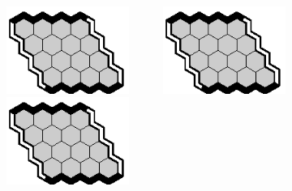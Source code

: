 \documentclass[12pt]{article}
\begin{document}
\begin{center}
\includegraphics[width=40mm]{fz/pix/4x4.eps}~~~~~~\includegraphics[width=40mm]{fz/pix/4x4.eps}~~~~~~\includegraphics[width=40mm]{fz/pix/4x4.eps}
\end{center}


\end{document}
